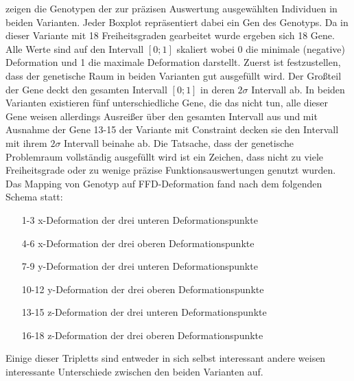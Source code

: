  zeigen die Genotypen der zur präzisen Auswertung ausgewählten Individuen in beiden Varianten.
Jeder Boxplot repräsentiert dabei ein Gen des Genotyps.
Da in dieser Variante mit 18 Freiheitsgraden gearbeitet wurde ergeben sich 18 Gene.
Alle Werte sind auf den Intervall $[0;1]$ skaliert wobei 0 die minimale (negative) Deformation und 1 die maximale Deformation darstellt.
Zuerst ist festzustellen, dass der genetische Raum in beiden Varianten gut ausgefüllt wird.
Der Großteil der Gene deckt den gesamten Intervall $[0;1]$ in deren $2\sigma$ Intervall ab.
In beiden Varianten existieren fünf unterschiedliche Gene, die das nicht tun, alle dieser Gene weisen allerdings Ausreißer über den gesamten Intervall aus und mit Ausnahme der Gene 13-15 der Variante mit Constraint decken sie den Intervall mit ihrem $2\sigma$ Intervall beinahe ab.
Die Tatsache, dass der genetische Problemraum vollständig ausgefüllt wird ist ein Zeichen, dass nicht zu viele Freiheitsgrade oder zu wenige präzise Funktionsauswertungen genutzt wurden.
Das Mapping von Genotyp auf FFD-Deformation fand nach dem folgenden Schema statt:
\begin{enumerate}
	\item[1-3] x-Deformation der drei unteren Deformationspunkte
	\item[4-6] x-Deformation der drei oberen Deformationspunkte
	\item[7-9] y-Deformation der drei unteren Deformationspunkte
	\item[10-12] y-Deformation der drei oberen Deformationspunkte
	\item[13-15] z-Deformation der drei unteren Deformationspunkte
	\item[16-18] z-Deformation der drei oberen Deformationspunkte
\end{enumerate}

Einige dieser Tripletts sind entweder in sich selbst interessant andere weisen interessante Unterschiede zwischen den beiden Varianten auf.

